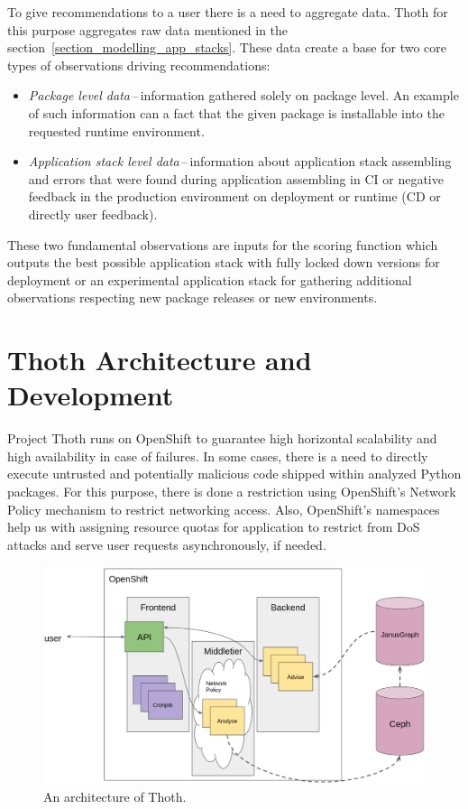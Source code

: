 \documentclass[a4paper]{llncs}
\begin{document}
To give recommendations to a user there is a need to aggregate data. Thoth for this purpose aggregates raw data mentioned in the section~\ref{section_modelling_app_stacks}. These data create a base for two core types of observations driving recommendations:

\begin{itemize}
  \item \emph{Package level data}\,--\,information gathered solely on package level. An example of such information can a fact that the given package is installable into the requested runtime environment.
  \item \emph{Application stack level data}\,--\,information about application stack assembling and errors that were found during application assembling in CI or negative feedback in the production environment on deployment or runtime (CD or directly user feedback).
\end{itemize}

These two fundamental observations are inputs for the scoring function which outputs the best possible application stack with fully locked down versions for deployment or an experimental application stack for gathering additional observations respecting new package releases or new environments.

\section{Thoth Architecture and Development}

Project Thoth runs on OpenShift to guarantee high horizontal scalability and high availability in case of failures. In some cases, there is a need to directly execute untrusted and potentially malicious code shipped within analyzed Python packages. For this purpose, there is done a restriction using OpenShift's Network Policy mechanism to restrict networking access. Also, OpenShift's namespaces help us with assigning resource quotas for application to restrict from DoS attacks and serve user requests asynchronously, if needed.

\begin{figure}[h!]
  \centering
  \includegraphics[width=1.0\textwidth]{fig/design.png}
  \caption{An architecture of Thoth.}
  \label{design}
\end{figure}
\end{document}
